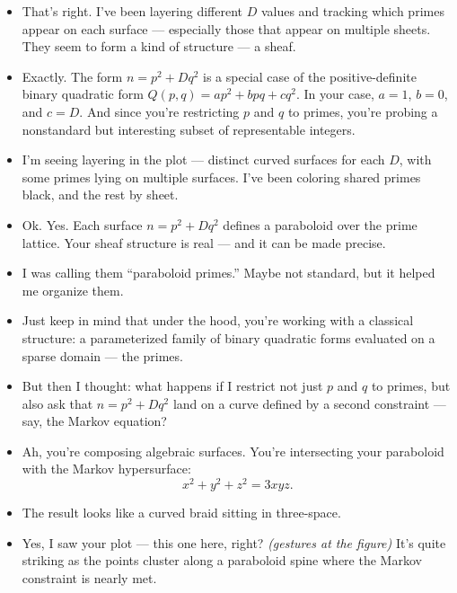 \begin{itemize}[leftmargin=0.6cm, label={}]

    \item[\textbf{Celia}]  
That’s right. I’ve been layering different $D$ values and tracking which primes appear on each surface — especially those that appear on multiple sheets. They seem to form a kind of structure — a sheaf.

    \item[\textbf{Claude}]  
Exactly. The form $n = p^2 + Dq^2$ is a special case of the positive-definite binary quadratic form $Q(p, q) = ap^2 + b pq + cq^2$. In your case, $a = 1$, $b = 0$, and $c = D$. And since you’re restricting $p$ and $q$ to primes, you’re probing a nonstandard but interesting subset of representable integers.

\item[\textbf{Celia}]  
I’m seeing layering in the plot — distinct curved surfaces for each $D$, with some primes lying on multiple surfaces. I’ve been coloring shared primes black, and the rest by sheet.

\item[\textbf{Claude}]  
Ok. Yes. Each surface $n = p^2 + Dq^2$ defines a paraboloid over the prime lattice. Your sheaf structure is real — and it can be made precise. 

\item[\textbf{Celia}]  
I was calling them “paraboloid primes.” Maybe not standard, but it helped me organize them.

\item[\textbf{Claude}]  
Just keep in mind that under the hood, you’re working with a classical structure: a parameterized family of binary quadratic forms evaluated on a sparse domain — the primes.

\item[\textbf{Celia}]  
But then I thought: what happens if I restrict not just $p$ and $q$ to primes, but also ask that $n = p^2 + Dq^2$ land on a curve defined by a second constraint — say, the Markov equation?

\item[\textbf{Claude}]  
Ah, you’re composing algebraic surfaces. You're intersecting your paraboloid with the Markov hypersurface:
\[
x^2 + y^2 + z^2 = 3xyz.
\]

\item[\textbf{Celia}]  
The result looks like a curved braid sitting in three-space.

\item[\textbf{Claude}]  
Yes, I saw your plot — this one here, right? \emph{(gestures at the figure)}  
It’s quite striking as the points cluster along a paraboloid spine where the Markov constraint is nearly met.


\end{itemize}
